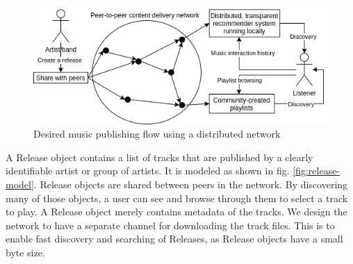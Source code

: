 \begin{figure}
    \centering
    \includegraphics[width=0.8\linewidth]{design/desired-music-publishing-situation.png}
    \caption{Desired music publishing flow using a distributed network}
    \label{fig:desired-music-publishing-situation}
\end{figure}

A Release object contains a list of tracks that are published by a clearly identifiable artist or group of artists. It is modeled as shown in fig. \ref{fig:release-model}. Release objects are shared between peers in the network. By discovering many of those objects, a user can see and browse through them to select a track to play. A Release object merely contains metadata of the tracks. We design the network to have a separate channel for downloading the track files. This is to enable fast discovery and
searching of Releases, as Release objects have a small byte size. 
